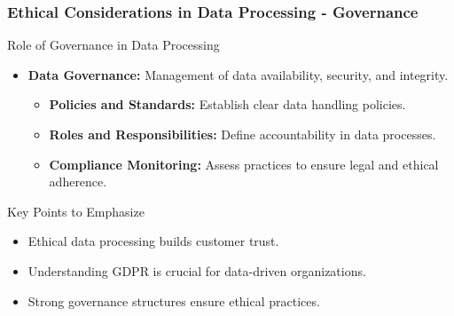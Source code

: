\documentclass[aspectratio=169]{beamer}
\begin{document}
\begin{frame}[fragile]
    \frametitle{Ethical Considerations in Data Processing - Governance}
    \begin{block}{Role of Governance in Data Processing}
        \begin{itemize}
            \item \textbf{Data Governance:} Management of data availability, security, and integrity.
            \begin{itemize}
                \item \textbf{Policies and Standards:} Establish clear data handling policies.
                \item \textbf{Roles and Responsibilities:} Define accountability in data processes.
                \item \textbf{Compliance Monitoring:} Assess practices to ensure legal and ethical adherence.
            \end{itemize}
        \end{itemize}
    \end{block}

    \begin{block}{Key Points to Emphasize}
        \begin{itemize}
            \item Ethical data processing builds customer trust.
            \item Understanding GDPR is crucial for data-driven organizations.
            \item Strong governance structures ensure ethical practices.
        \end{itemize}
    \end{block}
\end{frame}
\end{document}
